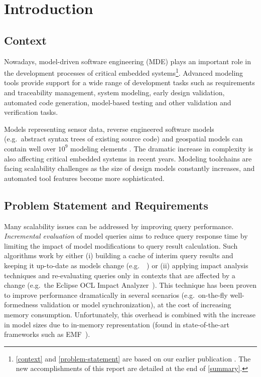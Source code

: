 \chapter{Introduction}
\label{chap:introduction}


\section{Context}
\label{context}

Nowadays, model-driven software engineering (MDE) plays an important role in the development processes of critical embedded systems\footnote{\autoref{context} and \autoref{problem-statement} are based on our earlier publication \cite{Izso:2013:IIG:2487766.2487772}. The new accomplishments of this report are detailed at the end of \autoref{summary}.}. Advanced modeling tools provide support for a wide range of development tasks such as requirements and traceability management, system modeling, early design validation, automated code generation, model-based testing and other validation and verification tasks. 

Models representing sensor data, reverse engineered software models (e.g.\ abstract syntax trees of existing source code) and geospatial models can contain well over $10^9$ modeling elements \cite{Scheidgen12}. The dramatic increase in complexity is also affecting critical embedded systems in recent years. Modeling toolchains are facing scalability challenges as the size of design models constantly increases, and automated tool features become more sophisticated.

\section{Problem Statement and Requirements}
\label{problem-statement}

Many scalability issues can be addressed by improving query performance. \emph{Incremental evaluation} of model queries aims to reduce query response time by limiting the impact of model modifications to query result calculation. Such algorithms work by either (i) building a cache of interim query results and keeping it up-to-date as models change (e.g.\ \eiq{}~\cite{models10}) or (ii) applying impact analysis techniques and re-evaluating queries only in contexts that are affected by a change (e.g.\ the Eclipse OCL Impact Analyzer~\cite{OCLIA}). This technique has been proven to improve performance dramatically in several scenarios (e.g.\ on-the-fly well-formedness validation or model synchronization), at the cost of increasing memory consumption. Unfortunately, this overhead is combined with the increase in model sizes due to in-memory representation (found in state-of-the-art frameworks such as EMF~\cite{EMF}).

